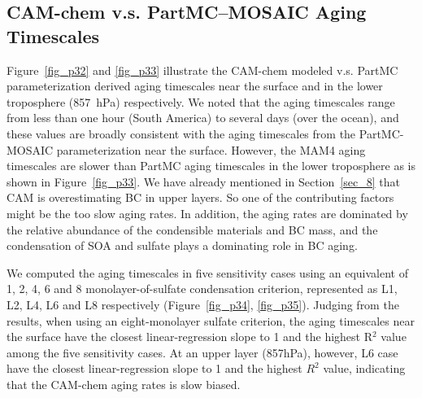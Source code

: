 \documentclass[12pt, fullpage]{uiucthesis2009_2}
\begin{document}
	\subsection{CAM-chem v.s. PartMC--MOSAIC Aging Timescales}
	Figure~\ref{fig_p32} and \ref{fig_p33} illustrate the CAM-chem modeled v.s. PartMC parameterization derived aging timescales near the surface and in the lower troposphere (857~hPa) respectively. We noted that the aging timescales range from less than one hour (South America) to several days (over the ocean), and these values are broadly consistent with the aging timescales from the PartMC-MOSAIC parameterization near the surface. However, the MAM4 aging timescales are slower than PartMC aging timescales in the lower troposphere as is shown in Figure~\ref{fig_p33}. We have already mentioned in Section~\ref{sec_8} that CAM is overestimating BC in upper layers. So one of the contributing factors might be the too slow aging rates. In addition, the aging rates are dominated by the relative abundance of the condensible materials and BC mass, and the condensation of SOA and sulfate plays a dominating role in BC aging.
	
	We computed the aging timescales in five sensitivity cases using an equivalent of 1, 2, 4, 6 and 8 monolayer-of-sulfate condensation criterion, represented as L1, L2, L4, L6 and L8 respectively (Figure~\ref{fig_p34}, \ref{fig_p35}). Judging from the results, when using an eight-monolayer sulfate criterion, the aging timescales near the surface have the closest linear-regression slope to 1 and the highest R$^2$ value among the five sensitivity cases. At an upper layer (857hPa), however, L6 case have the closest linear-regression slope to 1 and the highest $R^2$ value, indicating that the CAM-chem aging rates is slow biased. 
\end{document}
